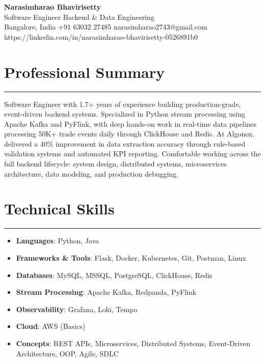 \documentclass[10pt]{article}
\begin{document}
\begin{center}
  {\huge\textbf{Narasimharao Bhavirisetty}}\\[3pt]
  Software Engineer \textbullet{} Backend \& Data Engineering \\[3pt]
  Bangalore, India \textbullet{} +91 63032 27485 \textbullet{} narasimharao2743@gmail.com \textbullet{} https://linkedin.com/in/narasimharao-bhavirisetty-0526891b0
\end{center}

\vspace{6pt}

\section*{Professional Summary}
\vspace{1pt}\hrule\vspace{4pt}
Software Engineer with 1.7+ years of experience building production-grade, event-driven backend systems. Specialized in Python stream processing using Apache Kafka and PyFlink, with deep hands-on work in real-time data pipelines processing 50K+ trade events daily through ClickHouse and Redis. At Algonox, delivered a 40\% improvement in data extraction accuracy through rule-based validation systems and automated KPI reporting. Comfortable working across the full backend lifecycle: system design, distributed systems, microservices architecture, data modeling, and production debugging.

\section*{Technical Skills}
\vspace{1pt}\hrule\vspace{4pt}
\begin{itemize}
  \item \textbf{Languages}: Python, Java
  \item \textbf{Frameworks \& Tools}: Flask, Docker, Kubernetes, Git, Postman, Linux
  \item \textbf{Databases}: MySQL, MSSQL, PostgreSQL, ClickHouse, Redis
  \item \textbf{Stream Processing}: Apache Kafka, Redpanda, PyFlink
  \item \textbf{Observability}: Grafana, Loki, Tempo
  \item \textbf{Cloud}: AWS (Basics)
  \item \textbf{Concepts}: REST APIs, Microservices, Distributed Systems, Event-Driven Architecture, OOP, Agile, SDLC
\end{itemize}
\end{document}
